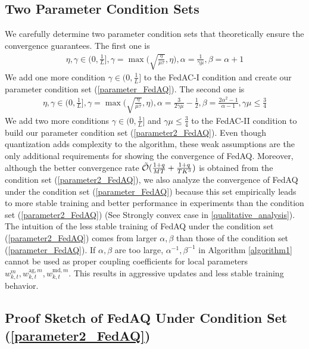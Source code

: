 \documentclass[11pt]{article}
\begin{document}
\subsection{Two Parameter Condition Sets}

We carefully determine two parameter condition sets that theoretically ensure the convergence guarantees. The first one is
\begin{align} \label{parameter_FedAQ}
    \eta, \gamma \in \Big( 0, \frac{1}{L} \Big], \gamma = \max \Big( \sqrt{\frac{\eta}{\mu\tau}}, \eta \Big), \alpha = \frac{1}{\gamma\mu}, \beta = \alpha + 1
\end{align}
We add one more condition $\gamma \in (0, \frac{1}{L}]$ to the FedAC-I condition \cite{Yeojoon-yuan2020federated} and create our parameter condition set (\ref{parameter_FedAQ}). The second one is
\begin{align} \label{parameter2_FedAQ}
    \eta, \gamma \in \Big( 0, \frac{1}{L} \Big], \gamma = \max \Big( \sqrt{\frac{\eta}{\mu\tau}}, \eta \Big), \alpha=\frac{3}{2\gamma\mu} - \frac{1}{2}, \beta = \frac{2\alpha^2-1}{\alpha-1}, \gamma\mu \leq \frac{3}{4}
\end{align}
We add two more conditions $\gamma \in (0, \frac{1}{L}]$ and $\gamma\mu \leq \frac{3}{4}$ to the FedAC-II condition to build our parameter condition set (\ref{parameter2_FedAQ}). Even though quantization adds complexity to the algorithm, these weak assumptions are the only additional requirements for showing the convergence of FedAQ. Moreover, although the better convergence rate $\Tilde{\mathcal{O}}(\frac{1+q}{MT}+\frac{1+q}{TK^3})$ is obtained from the condition set (\ref{parameter2_FedAQ}), we also analyze the convergence of FedAQ under the condition set (\ref{parameter_FedAQ}) because this set empirically leads to more stable training and better performance in experiments than the condition set (\ref{parameter2_FedAQ}) (See Strongly convex case in \cref{qualitative_analysis}). The intuition of the less stable training of FedAQ under the condition set (\ref{parameter2_FedAQ}) comes from larger $\alpha, \beta$ than those of the condition set (\ref{parameter_FedAQ}). If $\alpha, \beta$ are too large, $\alpha^{-1}, \beta^{-1}$ in Algorithm \ref{algorithm1} cannot be used as proper coupling coefficients for local parameters $w_{k, t}^m, w_{k, t}^{\textrm{ag}, m}, w_{k, t}^{\textrm{md}, m}$. This results in aggressive updates and less stable training behavior.

\subsection{Proof Sketch of FedAQ Under Condition Set (\ref{parameter2_FedAQ})}
\end{document}

